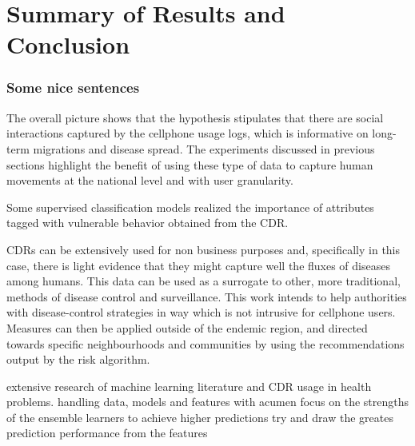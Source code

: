 
\chapter{Summary of Results and Conclusion}\label{ch:results_conclusion}




\subsection{Some nice sentences}


The overall picture shows that the hypothesis stipulates that there are social interactions captured by the cellphone usage logs, which is informative on long-term migrations and disease spread.
The experiments discussed in previous sections highlight the benefit of using these type of data to capture human movements at the national level and with user granularity.

Some supervised classification models realized the importance of attributes tagged with vulnerable behavior obtained from the CDR.



CDRs can be extensively used for non business purposes and, specifically in this case, there is light evidence that they might capture well the fluxes of diseases among humans.
This data can be used as a surrogate to other, more traditional, methods of disease control and surveillance.
This work intends to help authorities with disease-control strategies in way which is not intrusive for cellphone users.
Measures can then be applied outside of the endemic region, and directed towards specific neighbourhoods and communities by using the recommendations output by the risk algorithm.





extensive research of machine learning literature and CDR usage in health problems.
handling data, models and features with acumen
focus on the strengths of the ensemble learners to achieve higher predictions
try and draw the greates prediction performance from the features


